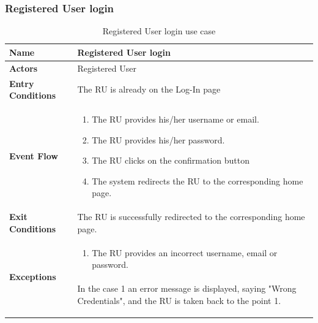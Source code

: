 					\subsubsection{Registered User login}
					\begin{table}[!h]
						\centering
						\vspace{-4mm}
						\begin{tabular}{lp{}}
							\toprule
							\textbf{Name} & \textbf{Registered User login} \\[1mm]
							\midrule
							\textbf{Actors} & Registered User \\[1mm]
							\textbf{Entry Conditions} & The RU is already on the Log-In page \vspace{1mm}\\
							\textbf{Event Flow} &
							\vspace{-5mm} 
							\begin{enumerate}
								\setlength\itemsep{0.2mm}
								\item The RU provides his/her username or email.
								\item The RU provides his/her password.
								\item The RU clicks on the confirmation button
								\item The system redirects the RU to the corresponding home page.
							\end{enumerate} \\
							\textbf{Exit Conditions} & The RU is successfully redirected to the corresponding home page. \vspace{1mm}\\
							\textbf{Exceptions} &
							\vspace{-5mm} 
							\begin{enumerate}
								\item The RU provides an incorrect username, email or password.
							\end{enumerate}
							\vspace{-7mm}
							\paragraph{}
								In the case 1 an error message is displayed, saying "Wrong Credentials", and the RU is taken
back to the point 1. \\[1mm]
							\bottomrule
						\end{tabular}
						\caption{Registered User login use case}
					\end{table}
					\vspace{-3mm}
